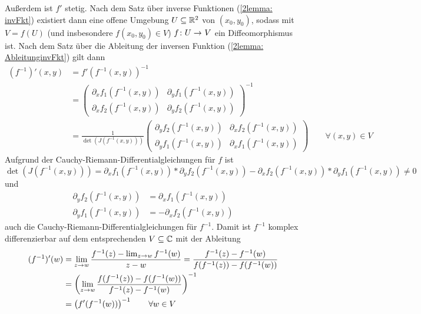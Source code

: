\begin{exercisePage}
	Außerdem ist $f'$ stetig. Nach dem Satz über inverse Funktionen (\cref{2lemma: invFkt}) existiert dann eine offene Umgebung $U \subseteq \mathbb{R}^2$ von $(x_0, y_0)$, sodass mit $V = f(U)$ (und insbesondere $f(x_0,y_0) \in V$) $\abb{f}{U}{V}$ ein Diffeomorphismus ist. Nach dem Satz über die Ableitung der inversen Funktion (\cref{2lemma: AbleitunginvFkt}) gilt dann 
	\begin{equation*}
		\begin{aligned}
			(f^{-1})'(x,y) &= f'(f^{-1}(x,y))^{-1} \\
			&= 
			\begin{pmatrix}
				\partial_x f_1(f^{-1}(x,y)) & \partial_y f_1(f^{-1}(x,y)) \\
				\partial_x f_2(f^{-1}(x,y)) & \partial_y f_2(f^{-1}(x,y))
			\end{pmatrix}^{-1} \\
			&=
			\frac{1}{\det(J(f^{-1}(x,y)))}
				\begin{pmatrix}
				\partial_y f_2(f^{-1}(x,y)) & \partial_x f_2(f^{-1}(x,y)) \\
				\partial_y f_1(f^{-1}(x,y)) & \partial_x f_1(f^{-1}(x,y))
			\end{pmatrix}
			\qquad \forall (x,y) \in V
		\end{aligned}
	\end{equation*} 
	Aufgrund der Cauchy-Riemann-Differentialgleichungen für $f$ ist $\det(J(f^{-1}(x,y))) = \partial_x f_1(f^{-1}(x,y)) * \partial_y f_2(f^{-1}(x,y)) - \partial_x f_2(f^{-1}(x,y)) * \partial_y f_1(f^{-1}(x,y)) \neq 0$ und
	\begin{equation*}
		\begin{aligned}
			\partial_y f_2(f^{-1}(x,y)) &=  \partial_x f_1(f^{-1}(x,y)) \\
			\partial_y f_1(f^{-1}(x,y)) &= -\partial_x f_2(f^{-1}(x,y))
		\end{aligned}
	\end{equation*}
	auch die Cauchy-Riemann-Differentialgleichungen für $f^{-1}$. Damit ist $f^{-1}$ komplex differenzierbar auf dem entsprechenden $V \subseteq \mathbb{C}$ mit der Ableitung
	\begin{equation*}
		\begin{aligned}
			(f^{-1})'(w) &= \lim_{z \to w} \frac{f^{-1}(z) - \lim_{z \to w} f^{-1}(w)}{z-w} = \frac{f^{-1}(z) - f^{-1}(w)}{f(f^{-1}(z)) - f(f^{-1}(w))} \\
			&= \left( \lim_{z \to w} \frac{f(f^{-1}(z)) - f(f^{-1}(w))}{f^{-1}(z) - f^{-1}(w)} \right)^{-1} \\
			&= \left( f'(f^{-1}(w)) \right)^{-1} \qquad \forall w \in V
		\end{aligned}
	\end{equation*}
\end{exercisePage}